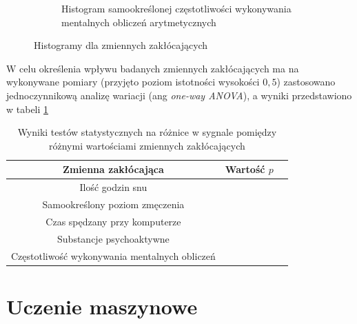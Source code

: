 \documentclass{./assets/wfis}
\begin{document}
\begin{figure}[h!]
\begin{subfigure}[b]{\textwidth}
    \caption{Histogram samookreślonej częstotliwości wykonywania mentalnych obliczeń arytmetycznych}
    \label{fig:arithmetic}
\end{subfigure}
\caption{Histogramy dla zmiennych zakłócających}
\end{figure}

W celu określenia wpływu  badanych zmiennych zakłócających ma na wykonywane pomiary (przyjęto poziom istotności wysokości $0,5$) zastosowano jednoczynnikową analizę wariacji (ang \textit{one-way ANOVA}), a wyniki przedstawiono w tabeli \ref{tab:confunding-variables-statistical-tests} 

\begin{table}[h!]
    \centering
    \begin{tabular}{|c|c|c|}
        \hline
          Zmienna zakłócająca & Wartość $p$\\
        \hline
         Ilość godzin snu & \\
         Samookreślony poziom zmęczenia &  \\
         Czas spędzany przy komputerze & \\
         Substancje psychoaktywne  & \\
         Częstotliwość wykonywania mentalnych obliczeń & \\
        \hline
    \end{tabular}
    \caption{Wyniki testów statystycznych na różnice w sygnale pomiędzy różnymi wartościami zmiennych zakłócających}
    \label{tab:confunding-variables-statistical-tests}
\end{table}

\section{Uczenie maszynowe}\label{uczenie-maszynowe}
\end{document}
